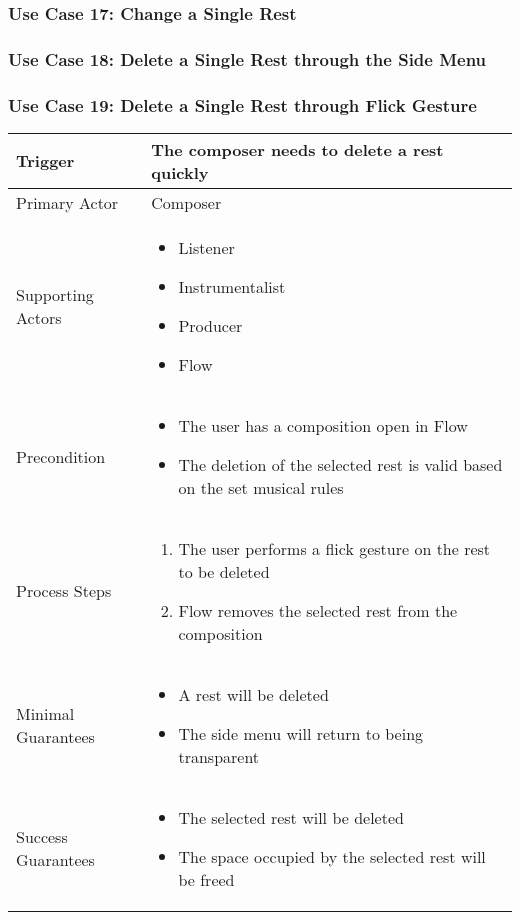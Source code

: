 
\subsubsection{Use Case 17: Change a Single Rest}


\subsubsection{Use Case 18: Delete a Single Rest through the Side Menu}



\subsubsection{Use Case 19: Delete a Single Rest through Flick Gesture}

\begin{tabularx}{\textwidth}{|X|X|}
\hline
Trigger & 
The composer needs to delete a rest quickly \\
\hline
Primary Actor & 
Composer\\
\hline
Supporting Actors & 
\begin{itemize}
\item Listener
\item Instrumentalist
\item Producer
\item Flow
\end{itemize} \\
\hline
Precondition & 
\begin{itemize}
\item The user has a composition open in Flow 
\item The deletion of the selected rest is valid based on the set musical rules
\end{itemize} \\
\hline
Process Steps & 
\begin{enumerate}
\item The user performs a flick gesture on the rest to be deleted
\item Flow removes the selected rest from the composition
\end{enumerate} \\
\hline
Minimal Guarantees & 
\begin{itemize}
  \item A rest will be deleted
  \item The side menu will return to being transparent
\end{itemize} \\
\hline
Success Guarantees & 
\begin{itemize}
  \item The selected rest will be deleted
  \item The space occupied by the selected rest will be freed
\end{itemize} \\
\hline
\end{tabularx}

